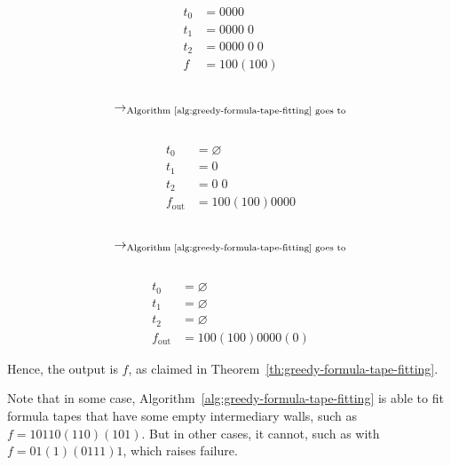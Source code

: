 \begin{example}
\begin{multicols}{5}
        \noindent
        \begin{align*}
            t_0 & = 0000           \\
            t_1 & =  0000 \; 0     \\
            t_2 & =  0000 \; 0\; 0 \\
            f   & = 100 (100)
        \end{align*}
        \begin{align*}
             &                                                                   \\
            \to_{\text{Algorithm~\ref{alg:greedy-formula-tape-fitting} goes to}} \\
             &
        \end{align*}
        \begin{align*}
            t_0          & = \varnothing    \\
            t_1          & =   0            \\
            t_2          & =   0\; 0        \\
            f_\text{out} & = 100 (100) 0000
        \end{align*}
        \begin{align*}
             &                                                                   \\
            \to_{\text{Algorithm~\ref{alg:greedy-formula-tape-fitting} goes to}} \\
             &
        \end{align*}
        \begin{align*}
            t_0          & = \varnothing        \\
            t_1          & =  \varnothing       \\
            t_2          & =  \varnothing       \\
            f_\text{out} & = 100 (100) 0000 (0)
        \end{align*}
    \end{multicols}

    Hence, the output is $f$, as claimed in Theorem~\ref{th:greedy-formula-tape-fitting}.

    Note that in some case, Algorithm~\ref{alg:greedy-formula-tape-fitting} is able to fit formula tapes that have some empty intermediary walls, such as $f=10110(110)(101)$. But in other cases, it cannot, such as with $f = 01 (1) (0111) 1$, which raises failure.

\end{example}


